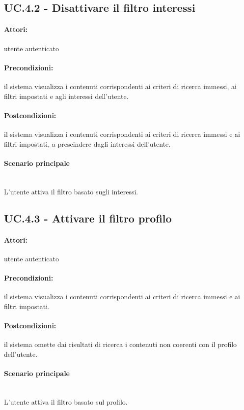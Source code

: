 \documentclass[10pt,a4paper,headinclude,footinclude,hidelinks]{scrreprt} %
\begin{document}
	\subsection[UC.4.2]{UC.4.2 - Disattivare il filtro interessi}
	\label{sec:stage:ar:uc:4_2}
	\paragraph{Attori:} utente autenticato
	\paragraph{Precondizioni:} il sistema visualizza i contenuti corrispondenti ai criteri di ricerca immessi, ai filtri impostati e agli interessi dell'utente.
	\paragraph{Postcondizioni:} il sistema visualizza i contenuti corrispondenti ai criteri di ricerca immessi e ai filtri impostati, a prescindere dagli interessi dell'utente.
	\paragraph{Scenario principale} \hfill \\
	L'utente attiva il filtro basato sugli interessi.

	\subsection[UC.4.3]{UC.4.3 - Attivare il filtro profilo}
	\label{sec:stage:ar:uc:4_3}
	\paragraph{Attori:} utente autenticato
	\paragraph{Precondizioni:} il sistema visualizza i contenuti corrispondenti ai criteri di ricerca immessi e ai filtri impostati.
	\paragraph{Postcondizioni:} il sistema omette dai risultati di ricerca i contenuti non coerenti con il profilo dell'utente.
	\paragraph{Scenario principale} \hfill \\
	L'utente attiva il filtro basato sul profilo.
\end{document}
